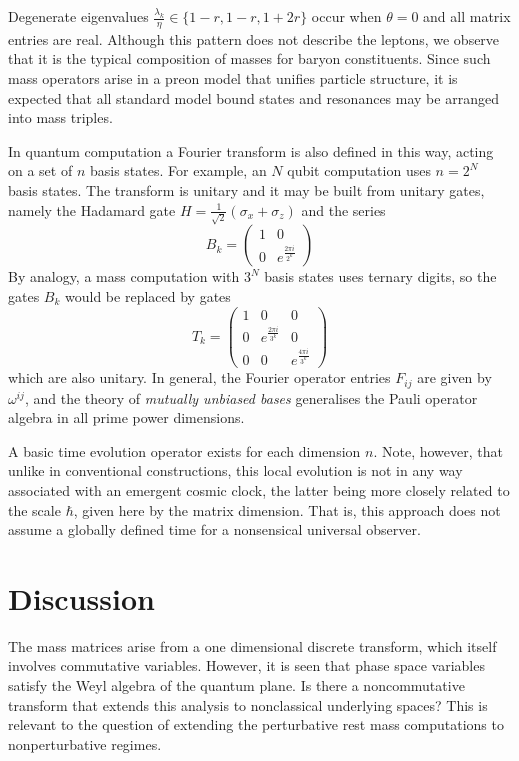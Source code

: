 \documentclass[aps,prl,onecolumn,showpacs,address,11pt]{revtex4}
\begin{document}
Degenerate eigenvalues $\frac{\lambda_{k}}{\eta} \in \{ 1 - r , 1
- r , 1 + 2r \}$ occur when $\theta = 0$ and all matrix entries
are real. Although this pattern does not describe the leptons, we
observe that it is the typical composition of masses for baryon
constituents. Since such mass operators arise in a preon model
that unifies particle structure, it is expected that all standard
model bound states and resonances may be arranged into mass
triples.

In quantum computation \cite{NielsenChuang} a Fourier transform is
also defined in this way, acting on a set of $n$ basis states. For example, an
$N$ qubit computation uses $n = 2^{N}$ basis states. The transform is
unitary and it may be built from unitary gates, namely the
Hadamard gate $H = \frac{1}{\sqrt{2}} (\sigma_{x} + \sigma_{z})$
and the series
\[ B_{k} = \left( \begin{array}{cc} 1 & 0 \\ 0 & e^{\frac{2 \pi i}{2^{k}}}
\end{array} \right) \] By analogy, a mass computation with $3^{N}$
basis states uses ternary digits, so the gates $B_{k}$ would be
replaced by gates \begin{equation} T_{k} = \left( \begin{array}{ccc} 1 & 0 & 0 \\
0 & e^{\frac{2 \pi i}{3^{k}}} & 0 \\ 0 & 0 & e^{\frac{4 \pi
i}{3^{k}}} \end{array} \right) \end{equation} which are also
unitary. In general, the Fourier operator entries $F_{ij}$ are given by $\omega^{ij}$, and the theory of {\em mutually unbiased bases} generalises the Pauli operator algebra in all prime power dimensions. 

A basic time evolution operator exists for each dimension $n$. Note, however, that unlike in conventional constructions, this local evolution is not in any way associated with an emergent cosmic clock, the latter being more closely related to the scale $\hbar$, given here by the matrix dimension. That is, this approach does not assume a globally defined time for a nonsensical universal
observer.

\section{Discussion}

The mass matrices arise from a one dimensional discrete transform,
which itself involves commutative variables. However, it is seen
that phase space variables satisfy the Weyl algebra of the quantum
plane. Is there a noncommutative transform that extends this
analysis to nonclassical underlying spaces? This is relevant to
the question of extending the perturbative rest mass computations
\cite{Brannen} to nonperturbative regimes.
\end{document}
